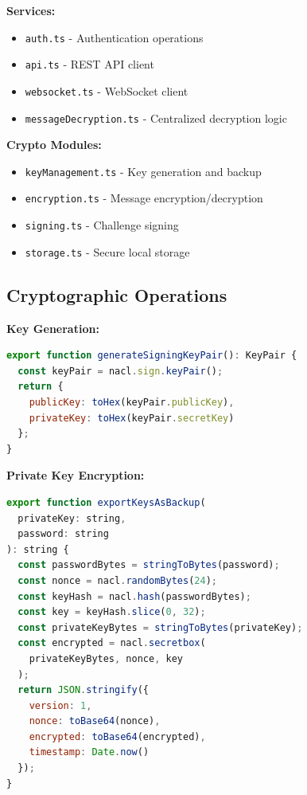 \textbf{Services:}
\begin{itemize}
    \item \texttt{auth.ts} - Authentication operations
    \item \texttt{api.ts} - REST API client
    \item \texttt{websocket.ts} - WebSocket client
    \item \texttt{messageDecryption.ts} - Centralized decryption logic
\end{itemize}

\textbf{Crypto Modules:}
\begin{itemize}
    \item \texttt{keyManagement.ts} - Key generation and backup
    \item \texttt{encryption.ts} - Message encryption/decryption
    \item \texttt{signing.ts} - Challenge signing
    \item \texttt{storage.ts} - Secure local storage
\end{itemize}

\subsection{Cryptographic Operations}

\textbf{Key Generation:}
\begin{lstlisting}[language=JavaScript]
export function generateSigningKeyPair(): KeyPair {
  const keyPair = nacl.sign.keyPair();
  return {
    publicKey: toHex(keyPair.publicKey),
    privateKey: toHex(keyPair.secretKey)
  };
}
\end{lstlisting}

\textbf{Private Key Encryption:}
\begin{lstlisting}[language=JavaScript]
export function exportKeysAsBackup(
  privateKey: string, 
  password: string
): string {
  const passwordBytes = stringToBytes(password);
  const nonce = nacl.randomBytes(24);
  const keyHash = nacl.hash(passwordBytes);
  const key = keyHash.slice(0, 32);
  const privateKeyBytes = stringToBytes(privateKey);
  const encrypted = nacl.secretbox(
    privateKeyBytes, nonce, key
  );
  return JSON.stringify({
    version: 1,
    nonce: toBase64(nonce),
    encrypted: toBase64(encrypted),
    timestamp: Date.now()
  });
}
\end{lstlisting}

